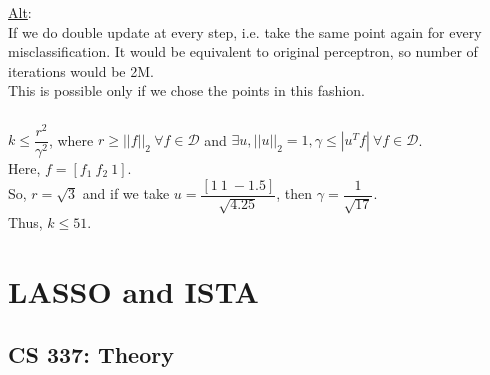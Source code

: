 \documentclass[12pt, fleqn]{article}
\begin{document}
\underline{Alt}: \\
If we do double update at every step, i.e. take the same point again for every misclassification. It would be equivalent to original perceptron, so number of iterations would be 2M. \\
This is possible only if we chose the points in this fashion.

\subsubsection{}
$k \le \dfrac{r^2}{\gamma^2}$, where $r \ge ||f||_2 \ \forall f \in \mathcal{D}$ and $\exists u, ||u||_2 = 1, \gamma \le |u^T f| \ \forall f \in \mathcal{D}$. \\
Here, $f = [f_1 \ f_2 \ 1]$. \\
So, $r = \sqrt{3}$ and if we take $u = \dfrac{[1 \ 1 \ -1.5]}{\sqrt{4.25}}$, then $\gamma = \dfrac{1}{\sqrt{17}}$. \\
Thus, $k \le 51$.


\newpage
\section{LASSO and ISTA}
\subsection{CS 337: Theory}
\end{document}
